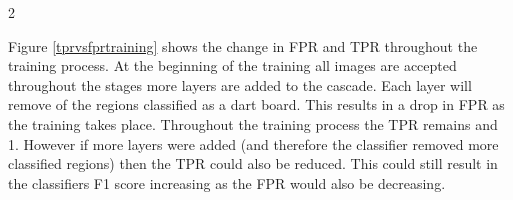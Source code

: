 \documentclass{article}
\begin{document}
\begin{multicols}{2}
\begin{multicols}{2}
{
  }
 

\end{multicols}{2}

Figure \ref{tprvsfprtraining} shows the change in FPR and TPR throughout the
training process. At the beginning of the training all images are accepted
throughout the stages more layers are added to the cascade. Each layer will
remove of the regions classified as a dart board. This results in a drop in FPR
as the training takes place. Throughout the training process the TPR remains
and 1. However if more layers were added (and therefore the classifier removed
more classified regions) then the TPR could also be reduced. This could still
result in the classifiers F1 score increasing as the FPR would also be
decreasing.


\end{multicols}
\end{document}
